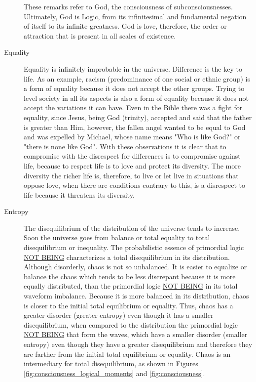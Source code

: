 \begin{description}
\begin{description}
	   \end{description}
	These remarks refer to God, the consciousness of subconsciousnesses. Ultimately, God is Logic, from its infinitesimal and fundamental negation of itself to its infinite greatness. God is love, therefore, the order or attraction that is present in all scales of existence.
	   \item[Equality] Equality is infinitely improbable in the universe. Difference is the key to life. As an example, racism (predominance of one social or ethnic group) is a form of equality because it does not accept the other groups. Trying to level society in all its aspects is also a form of equality because it does not accept the variations it can have. Even in the Bible there was a fight for equality, since Jesus, being God (trinity), accepted and said that the father is greater than Him, however, the fallen angel wanted to be equal to God and was expelled by Michael, whose name means "Who is like God?" or "there is none like God". With these observations it is clear that to compromise with the disrespect for differences is to compromise against life, because to respect life is to love and protect its diversity. The more diversity the richer life is, therefore, to live or let live in situations that oppose love, when there are conditions contrary to this, is a disrespect to life because it threatens its diversity.
	   \item[Entropy] The disequilibrium of the distribution of the universe tends to increase. Soon the universe goes from balance or total equality to total disequilibrium or inequality. The probabilistic essence of primordial logic \underline{NOT BEING} characterizes a total disequilibrium in its distribution. Although disorderly, chaos is not so unbalanced. It is easier to equalize or balance the chaos which tends to be less discrepant because it is more equally distributed, than the primordial logic \underline{NOT BEING} in its total waveform imbalance. Because it is more balanced in its distribution, chaos is closer to the initial total equilibrium or equality. Thus, chaos has a greater disorder (greater entropy) even though it has a smaller disequilibrium, when compared to the distribution the primordial logic \underline{NOT BEING} that form the waves, which have a smaller disorder (smaller entropy) even though they have a greater disequilibrium and therefore they are farther from the initial total equilibrium or equality. Chaos is an intermediary for total disequilibrium, as shown in Figures \ref{fig:consciousness_logical_moments} and \ref{fig:consciousness}. 

\end{description}
